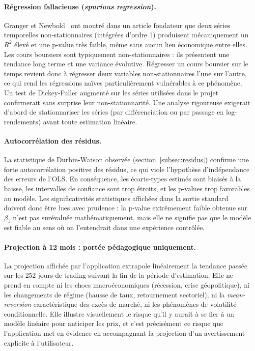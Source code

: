\documentclass[11pt,a4paper]{article}
\begin{document}
\paragraph{Régression fallacieuse (\textit{spurious regression}).}
Granger et Newbold~\cite{granger1974} ont montré dans un article
fondateur que deux séries temporelles non-stationnaires (intégrées
d'ordre 1) produisent mécaniquement un $R^2$ élevé et une p-value très
faible, même sans aucun lien économique entre elles. Les cours
boursiers sont typiquement non-stationnaires : ils présentent une
tendance long terme et une variance évolutive. Régresser un cours
boursier sur le temps revient donc à régresser deux variables
non-stationnaires l'une sur l'autre, ce qui rend les régressions
naïves particulièrement vulnérables à ce phénomène. Un test de
Dickey-Fuller augmenté sur les séries utilisées dans le projet
confirmerait sans surprise leur non-stationnarité. Une analyse
rigoureuse exigerait d'abord de stationnariser les séries (par
différenciation ou par passage en log-rendements) avant toute
estimation linéaire.

\paragraph{Autocorrélation des résidus.}
La statistique de Durbin-Watson observée
(section~\ref{subsec:residus}) confirme une forte autocorrélation
positive des résidus, ce qui viole l'hypothèse d'indépendance des
erreurs de l'OLS. En conséquence, les écarts-types estimés sont
biaisés à la baisse, les intervalles de confiance sont trop étroits,
et les p-values trop favorables au modèle. Les significativités
statistiques affichées dans la sortie standard doivent donc être lues
avec prudence : la p-value extrêmement faible obtenue sur $\beta_1$
n'est pas surévaluée mathématiquement, mais elle ne signifie pas que
le modèle est \og fiable \fg au sens où on l'entendrait dans une
expérience contrôlée.

\paragraph{Projection à 12 mois : portée pédagogique uniquement.}
La projection affichée par l'application extrapole linéairement la
tendance passée sur les 252 jours de trading suivant la fin de la
période d'estimation. Elle ne prend en compte ni les chocs
macroéconomiques (récession, crise géopolitique), ni les changements
de régime (hausse de taux, retournement sectoriel), ni la
\textit{mean-reversion} caractéristique des excès de marché, ni les
phénomènes de volatilité conditionnelle. Elle illustre visuellement le
risque qu'il y aurait à se fier à un modèle linéaire pour anticiper
les prix, et c'est précisément ce risque que l'application met en
évidence en accompagnant la projection d'un avertissement explicite à
l'utilisateur.
\end{document}
